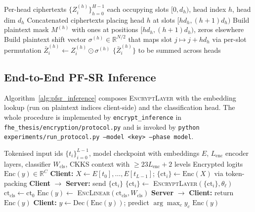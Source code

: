 \begin{algorithm}[htbp]
\caption{\textsc{ZeroPadConcat} --- multi-head concat under FHE}
\label{alg:pfsr_attn}
\begin{algorithmic}[1]
\REQUIRE Per-head ciphertexts $\{Z^{(h)}_i\}_{h=0}^{H-1}$ each occupying slots $[0, d_h)$, head index $h$, head dim $d_h$
\ENSURE Concatenated ciphertexts placing head $h$ at slots $[hd_h, (h+1)d_h)$
\STATE Build plaintext mask $M^{(h)}$ with ones at positions $[hd_h, (h+1)d_h)$, zeros elsewhere
\STATE Build plaintext shift vector $\sigma^{(h)} \in \mathbb{R}^{N/2}$ that maps slot $j \mapsto j + hd_h$ via per-slot permutation 
    \STATE $\bar{Z}^{(h)}_i \gets Z^{(h)}_i \odot \sigma^{(h)}$ 
\ENDFOR
\RETURN $\{\bar{Z}^{(h)}_i\}$ to be summed across heads
\end{algorithmic}
\end{algorithm}

\subsection{End-to-End PF-SR Inference}
Algorithm~\ref{alg:pfsr_inference} composes \textsc{EncryptLayer} with the embedding lookup (run on plaintext indices client-side) and the classification head. The whole procedure is implemented by \texttt{encrypt\_inference} in \texttt{fhe\_thesis/encryption/protocol.py} and is invoked by \texttt{python experiments/run\_protocol.py --model <key> --phase model}.

\begin{algorithm}[htbp]
\caption{\textsc{PFSR-Inference} --- end-to-end encrypted forward pass}
\label{alg:pfsr_inference}
\begin{algorithmic}[1]
\REQUIRE Tokenised input ids $\{t_i\}_{i=0}^{L-1}$, model checkpoint with embeddings $E$, $L_{\mathrm{enc}}$ encoder layers, classifier $W_{\mathrm{cls}}$, CKKS context with $\geq 23 L_{\mathrm{enc}} + 2$ levels
\ENSURE Encrypted logits $\mathrm{Enc}(y) \in \mathbb{R}^{C}$
\STATE \textbf{Client:} $X \gets E[t_0],\ldots,E[t_{L-1}]$; $\{\mathrm{ct}_i\} \gets \mathrm{Enc}(X)$ via token-packing
\STATE \textbf{Client} $\to$ \textbf{Server:} send $\{\mathrm{ct}_i\}$
    \STATE $\{\mathrm{ct}_i\} \gets$ \textsc{EncryptLayer}$(\{\mathrm{ct}_i\}, \theta_\ell)$ 
\ENDFOR
\STATE $\mathrm{ct}_{\mathrm{cls}} \gets \mathrm{ct}_0$ 
\STATE $\mathrm{Enc}(y) \gets$ \textsc{EncLinear}$(\mathrm{ct}_{\mathrm{cls}}, W_{\mathrm{cls}})$ 
\STATE \textbf{Server} $\to$ \textbf{Client:} return $\mathrm{Enc}(y)$
\STATE \textbf{Client:} $y \gets \mathrm{Dec}(\mathrm{Enc}(y))$; predict $\arg\max_c y_c$
\RETURN $\mathrm{Enc}(y)$
\end{algorithmic}
\end{algorithm}

